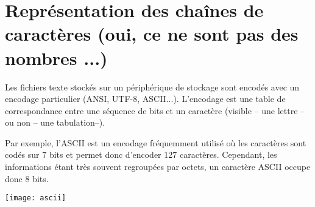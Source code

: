 \section{Représentation des chaînes de caractères (oui, ce ne sont pas des nombres ...)}

Les fichiers texte stockés sur un périphérique de stockage sont encodés avec un encodage particulier (ANSI, UTF-8, ASCII...). L'encodage est une table de correspondance entre une séquence de bits et un caractère (visible -- une lettre -- ou non -- une tabulation--).

Par exemple, l'ASCII est un encodage fréquemment utilisé où les caractères sont codés sur 7 bits et permet donc d'encoder 127 caractères. Cependant, les informations étant très souvent regroupées par octets, un caractère ASCII occupe donc 8 bits. 
\begin{center}
\texttt{[image: ascii]}
\end{center}